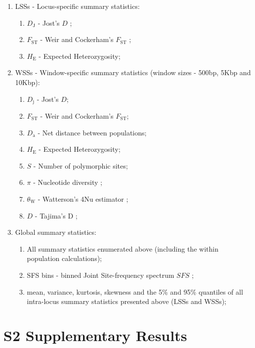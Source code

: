 \documentclass[a4paper, 12pt]{article}
\begin{document}
\begin{enumerate}
 \item LSSs - Locus-specific summary statistics:
    \begin{enumerate}
     \item $D_{\mathrm{J}}$ - Jost's $D$ \citep{Jost:2008cs,Jost:2009hn};
        \item $F_{\mathrm{ST}}$ - Weir and Cockerham's $F_{\mathrm{ST}}$ \citep{Weir:1984dx};
        \item $H_{\mathrm{E}}$ - Expected Heterozygosity;
    \end{enumerate}
    \item WSSs - Window-specific summary statistics (window sizes - 500bp, 5Kbp and 10Kbp):
    \begin{enumerate}
        \item $D_{\mathrm{j}}$ - Jost's $D$;
        \item $F_{\mathrm{ST}}$ - Weir and Cockerham's $F_{\mathrm{ST}}$;
        \item $D_{\mathrm{a}}$ - Net distance between populations;
        \item $H_{\mathrm{E}}$ - Expected Heterozygosity;
        \item $S$ - Number of polymorphic sites;
        \item $\pi$ - Nucleotide diversity \citep{Nei:1979uk};
        \item $\theta_{\mathrm{W}}$ - Watterson's 4Nu estimator \citep{Watterson:1975bh};
        \item $D$ - Tajima's D \citep{Tajima:1989un};
    \end{enumerate}
    \item Global summary statistics:
    \begin{enumerate}
        \item All summary statistics enumerated above (including the within population calculations);
        \item SFS bins - binned Joint Site-frequency spectrum $SFS$ \citep{Ewing:2016gv};
        \item mean, variance, kurtosis, skewness and the 5\% and 95\% quantiles of all intra-locus summary statistics presented above (LSSs and WSSs);
    \end{enumerate}
\end{enumerate}

\section*{S2 Supplementary Results}
\end{document}
